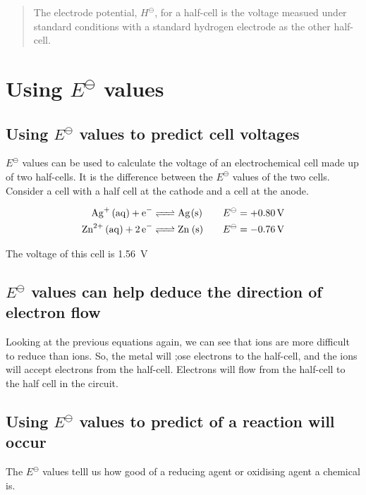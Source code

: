 \documentclass{scrbook}
\begin{document}
	\begin{quote}
		The electrode potential, $H^\ominus$, for a half-cell is the voltage measued under standard conditions with a standard hydrogen electrode as the other half-cell.
	\end{quote}

\section{Using $E^\ominus$ values}

\subsection{Using $E^\ominus$ values to predict cell voltages}

	$E^\ominus$ values can be used to calculate the voltage of an electrochemical cell made up of two half-cells. It is the difference between the $E^\ominus$ values of the two cells. Consider a cell with a  half cell at the cathode and a  cell at the anode.

	\begin{align*}
		\ce{ Ag+ (aq) + e- &<=> Ag(s) } && &E^\ominus &= \SI[explicit-sign=+]{0.80}{\volt} \\
		\ce{ Zn^{2+} (aq) +2e- &<=> Zn (s) } && &E^\ominus &= \SI[explicit-sign=+]{-0.76}{\volt}
	\end{align*}

	The voltage of this cell is \SI{1.56}{\volt}

\subsection{$E^\ominus$ values can help deduce the direction of electron flow}

	Looking at the previous equations again, we can see that  ions are more difficult to reduce than  ions. So, the  metal will ;ose electrons to the  half-cell, and the  ions will accept electrons from the  half-cell. Electrons will flow from the  half-cell to the  half cell in the circuit.

\subsection{Using $E^\ominus$ values to predict of a reaction will occur}

	The $E^\ominus$ values telll us how good of a reducing agent or oxidising agent a chemical is.
\end{document}
